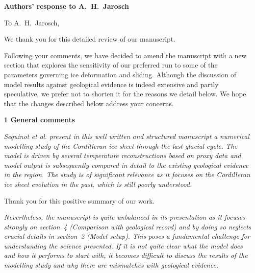


\textbf{Authors' response to A.~H.~Jarosch}
\bigskip


\newcommand{\sechead}[1]{\bigskip\noindent\textbf{#1}}
\newcommand{\referee}[1]{\bigskip\textcolor{journalname}{\textit{#1}}}
\newcommand{\msquote}[1]{\begin{quote}\textit{#1}\end{quote}}
\newcommand{\doi}[1]{doi:\allowbreak\href{http://dx.doi.org/#1}{#1}}

To A.~H.~Jarosch,

We thank you for this detailed review of our manuscript.

Following your comments, we have decided to amend the manuscript with a new
section that explores the sensitivity of our preferred run to some of the
parameters governing ice deformation and sliding. Although the discussion of
model results against geological evidence is indeed extensive and partly
speculative, we prefer not to shorten it for the reasons we detail below.
We hope that the changes described below address your concerns.


\sechead{1 \quad General comments}

\referee{%
    Seguinot et al. present in this well written and structured manuscript a
    numerical modelling study of the Cordilleran ice sheet through the last
    glacial cycle. The model is driven by several temperature reconstructions
    based on proxy data and model output is subsequently compared in detail to
    the existing geological evidence in the region. The study is of significant
    relevance as it focuses on the Cordilleran ice sheet evolution in the past,
    which is still poorly understood.}

Thank you for this positive summary of our work.

\referee{%
    Nevertheless, the manuscript is quite unbalanced in its presentation as it
    focuses strongly on section~4 (Comparison with geological record) and by
    doing so neglects crucial details in section~2 (Model setup). This poses a
    fundamental challenge for understanding the science presented. If it is not
    quite clear what the model does and how it performs to start with, it
    becomes difficult to discuss the results of the modelling study and why
    there are mismatches with geological evidence.}

